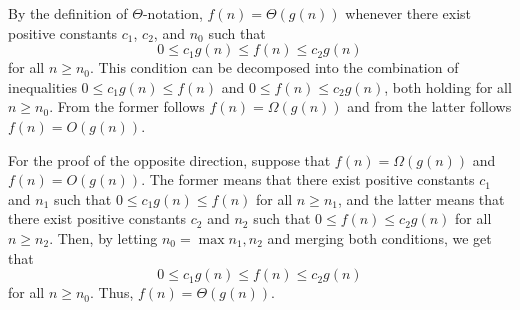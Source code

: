 By the definition of $\Theta$-notation, $f(n)=\Theta(g(n))$ whenever there exist positive constants $c_1$, $c_2$, and $n_0$ such that
\[
    0 \le c_1g(n) \le f(n) \le c_2g(n)
\]
for all $n\ge n_0$.
This condition can be decomposed into the combination of inequalities $0\le c_1g(n)\le f(n)$ and $0\le f(n)\le c_2g(n)$, both holding for all $n\ge n_0$.
From the former follows $f(n)=\Omega(g(n))$ and from the latter follows $f(n)=O(g(n))$.

For the proof of the opposite direction, suppose that $f(n)=\Omega(g(n))$ and $f(n)=O(g(n))$.
The former means that there exist positive constants $c_1$ and $n_1$ such that $0\le c_1g(n)\le f(n)$ for all $n\ge n_1$, and the latter means that there exist positive constants $c_2$ and $n_2$ such that $0\le f(n)\le c_2g(n)$ for all $n\ge n_2$.
Then, by letting $n_0=\max{n_1,n_2}$ and merging both conditions, we get that
\[
    0 \le c_1g(n) \le f(n) \le c_2g(n)
\]
for all $n\ge n_0$.
Thus, $f(n)=\Theta(g(n))$.
